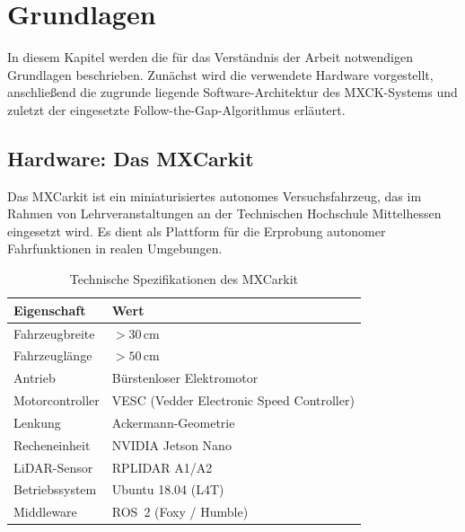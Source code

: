 \chapter{Grundlagen}
\label{ch:grundlagen}

In diesem Kapitel werden die für das Verständnis der Arbeit notwendigen
Grundlagen beschrieben. Zunächst wird die verwendete Hardware vorgestellt,
anschließend die zugrunde liegende Software-Architektur des MXCK-Systems
und zuletzt der eingesetzte Follow-the-Gap-Algorithmus erläutert.

\section{Hardware: Das MXCarkit}

Das MXCarkit ist ein miniaturisiertes autonomes Versuchsfahrzeug,
das im Rahmen von Lehrveranstaltungen an der Technischen Hochschule
Mittelhessen eingesetzt wird. Es dient als Plattform für die Erprobung
autonomer Fahrfunktionen in realen Umgebungen.

\begin{table}[H]
\centering
\caption{Technische Spezifikationen des MXCarkit}
\label{tab:specs}
\begin{tabular}{ll}
\toprule
\textbf{Eigenschaft} & \textbf{Wert} \\
\midrule
Fahrzeugbreite     & $> 30$\,cm \\
Fahrzeuglänge      & $> 50$\,cm \\
Antrieb            & Bürstenloser Elektromotor \\
Motorcontroller    & VESC (Vedder Electronic Speed Controller) \\
Lenkung            & Ackermann-Geometrie \\
Recheneinheit      & NVIDIA Jetson Nano \\
LiDAR-Sensor       & RPLIDAR A1/A2 \\
Betriebssystem     & Ubuntu 18.04 (L4T) \\
Middleware         & ROS~2 (Foxy / Humble) \\
\bottomrule
\end{tabular}
\end{table}


